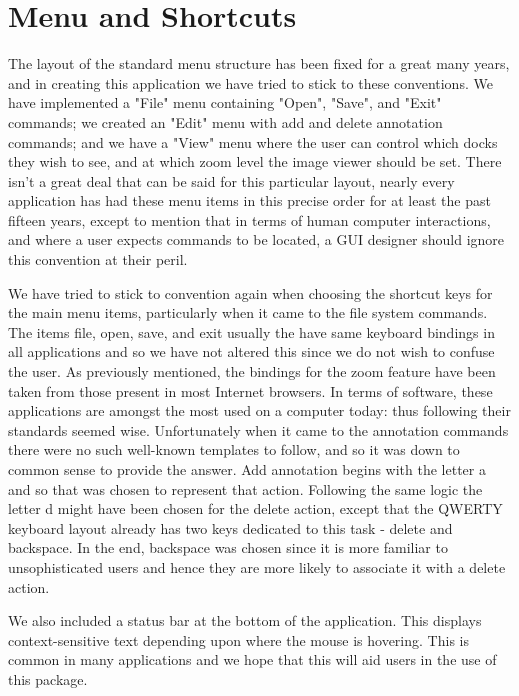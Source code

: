 \section{Menu and Shortcuts}
The layout of the standard menu structure has been fixed for a great many years, and in creating this application we have tried to stick to these conventions.  We have implemented a "File" menu containing "Open", "Save", and "Exit" commands; we created an "Edit"  menu with add and delete annotation commands; and we have a "View" menu where the user can control which docks they wish to see, and at which zoom level the image viewer should be set.  There isn’t a great deal that can be said for this particular layout, nearly every application has had these menu items in this precise order for at least the past fifteen years, except to mention that in terms of human computer interactions, and where a user expects commands to be located, a GUI designer should ignore this convention at their peril.

We have tried to stick to convention again when choosing the shortcut keys for the main menu items, particularly when it came to the file system commands.  The items file, open, save, and exit usually the have same keyboard bindings in all applications and so we have not altered this since we do not wish to confuse the user.  As previously mentioned, the bindings for the zoom feature have been taken from those present in most Internet browsers.  In terms of software, these applications are amongst the most used on a computer today: thus following their standards seemed wise.  Unfortunately when it came to the annotation commands there were no such well-known templates to follow, and so it was down to common sense to provide the answer.  Add annotation begins with the letter a and so that was chosen to represent that action.  Following the same logic the letter d might have been chosen for the delete action, except that the QWERTY keyboard layout already has two keys dedicated to this task - delete and backspace.  In the end, backspace was chosen since it is more familiar to unsophisticated users and hence they are more likely to associate it with a delete action.

We also included a status bar at the bottom of the application.  This displays context-sensitive text depending upon where the mouse is hovering.  This is common in many applications and we hope that this will aid users in the use of this package.
